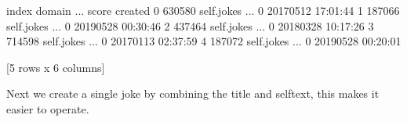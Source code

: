 \documentclass[letterpaper,10pt,english]{jupyterBook}
\begin{document}
\begin{sphinxVerbatim}[commandchars=\\\{\}]
   \PYG{p}{[} \PYG{p}{]}
  \PYG{p}{[}\PYG{p}{]}  \PYG{p}{[}\PYG{p}{]}  

\end{sphinxVerbatim}

\begin{sphinxVerbatim}[commandchars=\\\{\}]
    index      domain  ... score             created
0  630580  self.jokes  ...     0 2017\PYGZhy{}05\PYGZhy{}12 17:01:44
1  187066  self.jokes  ...     0 2019\PYGZhy{}05\PYGZhy{}28 00:30:46
2  437464  self.jokes  ...     0 2018\PYGZhy{}03\PYGZhy{}28 10:17:26
3  714598  self.jokes  ...     0 2017\PYGZhy{}01\PYGZhy{}13 02:37:59
4  187072  self.jokes  ...     0 2019\PYGZhy{}05\PYGZhy{}28 00:20:01

[5 rows x 6 columns]
\end{sphinxVerbatim}

\sphinxAtStartPar
Next we create a single joke by combining the title and selftext, this makes it easier to operate.

\begin{sphinxVerbatim}[commandchars=\\\{\}]
\PYG{p}{[}\PYG{p}{]}      
  \PYG{p}{[} \PYG{p}{]}
\end{sphinxVerbatim}
\end{document}
